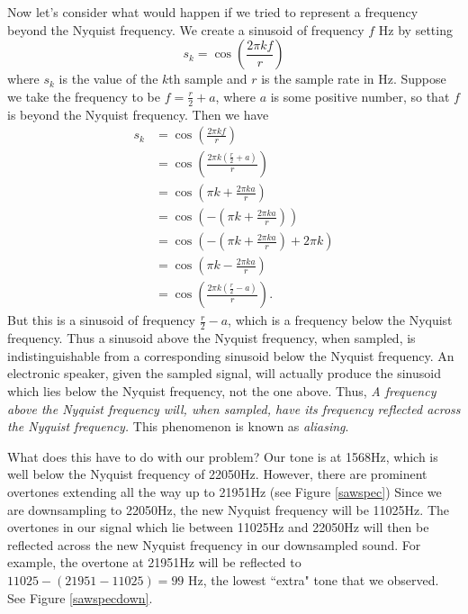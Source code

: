 Now let's consider what would happen if we tried to represent a frequency beyond the Nyquist frequency.
We create a sinusoid of frequency $f$ Hz by setting
$$s_k = \cos\left(\frac{2\pi kf}r\right)$$
where $s_k$ is the value of the $k$th sample and $r$ is the sample rate in Hz.
Suppose we take the frequency to be $f=\frac{r}2+a$, where $a$ is some positive number, so that $f$ is beyond the Nyquist frequency.
Then we have
\begin{align*}
s_k &= \cos\left(\frac{2\pi kf}r\right) \\
&= \cos\left(\frac{2\pi k(\frac{r}2+a)}r\right)\\
&= \cos\left(\pi k+\frac{2\pi ka}r\right)\\
&= \cos\left(-\left(\pi k+\frac{2\pi ka}r\right)\right)\\
&= \cos\left(-\left(\pi k+\frac{2\pi ka}r\right)+2\pi k \right)\\
&= \cos\left(\pi k-\frac{2\pi ka}r\right)\\
&= \cos\left(\frac{2\pi k(\frac{r}2-a)}r\right).
\end{align*}
But this is a sinusoid of frequency $\frac{r}2-a$, which is a frequency below the Nyquist frequency.
Thus a sinusoid above the Nyquist frequency, when sampled, is indistinguishable from a corresponding sinusoid below the Nyquist frequency.
An electronic speaker, given the sampled signal, will actually produce the sinusoid which lies below the Nyquist frequency, not the one above.
Thus, \emph{A frequency above the Nyquist frequency will, when sampled, have its frequency reflected across the Nyquist frequency.}
This phenomenon is known as \emph{aliasing}.

What does this have to do with our problem?
Our tone is at 1568Hz, which is well below the Nyquist frequency of 22050Hz.
However, there are prominent overtones extending all the way up to 21951Hz (see Figure \ref{sawspec})
 Since we are downsampling to 22050Hz, the new Nyquist frequency will be 11025Hz.
 The overtones in our signal which lie between 11025Hz and 22050Hz will then be reflected across the new Nyquist frequency in our downsampled sound.
 For example, the overtone at 21951Hz will be reflected to $11025-(21951-11025)=99$ Hz, the lowest ``extra" tone that we observed.
 See Figure \ref{sawspecdown}.

